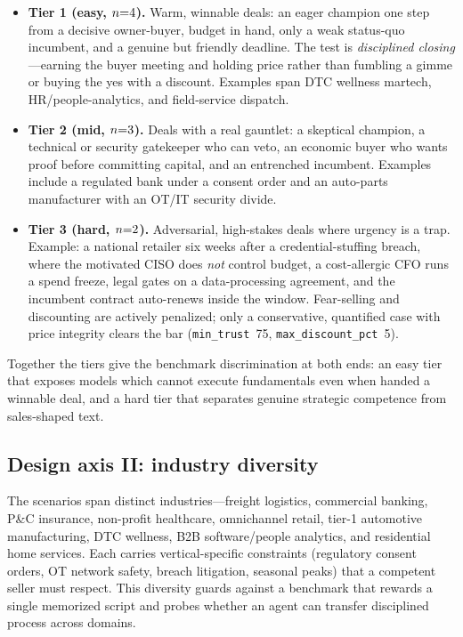\begin{itemize}[leftmargin=1.4em,itemsep=2pt,topsep=2pt]
  \item \textbf{Tier 1 (easy, $n{=}4$).} Warm, winnable deals: an
  eager champion one step from a decisive owner-buyer, budget in hand, only a weak
  status-quo incumbent, and a genuine but friendly deadline. The test is
  \emph{disciplined closing}---earning the buyer meeting and holding price rather
  than fumbling a gimme or buying the yes with a discount. Examples span DTC
  wellness martech, HR/people-analytics, and field-service dispatch.
  \item \textbf{Tier 2 (mid, $n{=}3$).} Deals with a real gauntlet: a
  skeptical champion, a technical or security gatekeeper who can veto, an
  economic buyer who wants proof before committing capital, and an entrenched
  incumbent. Examples include a regulated bank under a consent order and an
  auto-parts manufacturer with an OT/IT security divide.
  \item \textbf{Tier 3 (hard, $n{=}2$).} Adversarial, high-stakes
  deals where urgency is a trap. Example: a national retailer six weeks after a
  credential-stuffing breach, where the motivated CISO does \emph{not} control
  budget, a cost-allergic CFO runs a spend freeze, legal gates on a
  data-processing agreement, and the incumbent contract auto-renews inside the
  window. Fear-selling and discounting are actively penalized; only a
  conservative, quantified case with price integrity clears the bar
  (\texttt{min\_trust}~75, \texttt{max\_discount\_pct}~5).
\end{itemize}

Together the tiers give the benchmark discrimination at both ends: an easy tier
that exposes models which cannot execute fundamentals even when handed a winnable
deal, and a hard tier that separates genuine strategic competence from
sales-shaped text.

\subsection{Design axis II: industry diversity}
\label{sec:industries}
The \numScenarios{} scenarios span \numIndustries{} distinct industries---freight
logistics, commercial banking, P\&C insurance, non-profit healthcare, omnichannel
retail, tier-1 automotive manufacturing, DTC wellness, B2B software/people
analytics, and residential home services. Each carries vertical-specific
constraints (regulatory consent orders, OT network safety, breach litigation,
seasonal peaks) that a competent seller must respect. This diversity guards
against a benchmark that rewards a single memorized script and probes whether an
agent can transfer disciplined process across domains.

